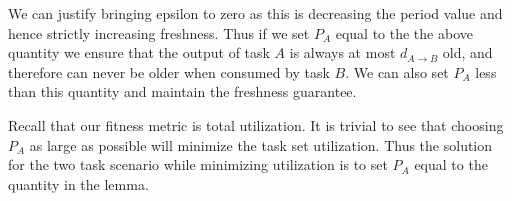 We can justify bringing epsilon to zero as this is decreasing the period value and hence strictly increasing freshness. Thus if we set $P_A$ equal to the the above quantity we ensure that the output of task $A$ is always at most $d_{A \to B}$ old, and therefore can never be older when consumed by task $B$. We can also set $P_A$ less than this quantity and maintain the freshness guarantee.

Recall that our fitness metric is total utilization. It is trivial to see that choosing $P_A$ as large as possible will minimize the task set utilization. Thus the solution for the two task scenario while minimizing utilization is to set $P_A$ equal to the quantity in the lemma.
